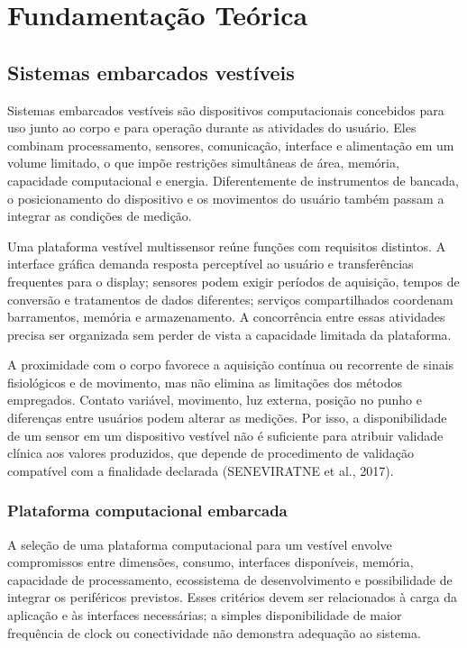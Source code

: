 \documentclass[a4paper,12pt]{article}
\begin{document}
\clearpage
\section{Fundamenta\c{c}\~ao Te\'orica}


\subsection{Sistemas embarcados vest\'iveis}


Sistemas embarcados vest\'iveis s\~ao dispositivos computacionais concebidos para uso junto ao corpo e para opera\c{c}\~ao durante as atividades do usu\'ario. Eles combinam processamento, sensores, comunica\c{c}\~ao, interface e alimenta\c{c}\~ao em um volume limitado, o que imp\~oe restri\c{c}\~oes simult\^aneas de \'area, mem\'oria, capacidade computacional e energia. Diferentemente de instrumentos de bancada, o posicionamento do dispositivo e os movimentos do usu\'ario tamb\'em passam a integrar as condi\c{c}\~oes de medi\c{c}\~ao.


Uma plataforma vest\'ivel multissensor re\'une fun\c{c}\~oes com requisitos distintos. A interface gr\'afica demanda resposta percept\'ivel ao usu\'ario e transfer\^encias frequentes para o display; sensores podem exigir per\'iodos de aquisi\c{c}\~ao, tempos de convers\~ao e tratamentos de dados diferentes; servi\c{c}os compartilhados coordenam barramentos, mem\'oria e armazenamento. A concorr\^encia entre essas atividades precisa ser organizada sem perder de vista a capacidade limitada da plataforma.


A proximidade com o corpo favorece a aquisi\c{c}\~ao cont\'inua ou recorrente de sinais fisiol\'ogicos e de movimento, mas n\~ao elimina as limita\c{c}\~oes dos m\'etodos empregados. Contato vari\'avel, movimento, luz externa, posi\c{c}\~ao no punho e diferen\c{c}as entre usu\'arios podem alterar as medi\c{c}\~oes. Por isso, a disponibilidade de um sensor em um dispositivo vest\'ivel n\~ao \'e suficiente para atribuir validade cl\'inica aos valores produzidos, que depende de procedimento de valida\c{c}\~ao compat\'ivel com a finalidade declarada (SENEVIRATNE et al., 2017).


\subsubsection{Plataforma computacional embarcada}


A sele\c{c}\~ao de uma plataforma computacional para um vest\'ivel envolve compromissos entre dimens\~oes, consumo, interfaces dispon\'iveis, mem\'oria, capacidade de processamento, ecossistema de desenvolvimento e possibilidade de integrar os perif\'ericos previstos. Esses crit\'erios devem ser relacionados \`a carga da aplica\c{c}\~ao e \`as interfaces necess\'arias; a simples disponibilidade de maior frequ\^encia de clock ou conectividade n\~ao demonstra adequa\c{c}\~ao ao sistema.
\end{document}
